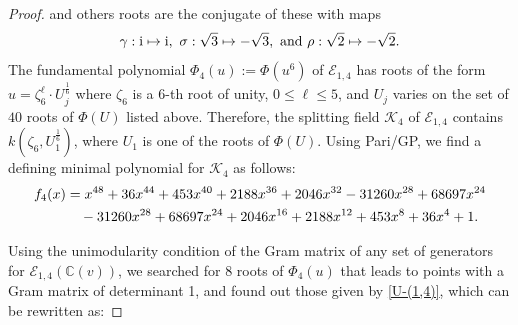 \documentclass[11pt]{amsart}
\newcommand{\CC}{{\mathbb C}}
\newcommand{\Ee}{{\mathcal E}}
\newcommand{\KK}{{\mathcal K}}
\numberwithin{equation}{section}
\numberwithin{table}{section}
\newcommand\<{\langle}
\begin{document}
\begin{proof}
	and others roots are the conjugate of these with maps  $$\gamma: {\rm{i}} \mapsto {\rm{i}}, \ \sigma: \sqrt{3}\mapsto -\sqrt{3}, \ \text{and} \ \rho: \sqrt{2}\mapsto -\sqrt{2}.$$ 
%
	The fundamental polynomial $\Phi_4(u):=\Phi(u^6)$ of  $\Ee_{1, 4}$  has roots of the form 
	$u=\zeta_{6}^\ell \cdot U_j^{\frac{1}{6}}$ where
	$\zeta_6$ is a $6$-th root of unity, $0\leq \ell \leq 5$, and $U_j$ varies on the set of $40$
	roots of $\Phi(U)$ listed above.
		Therefore,  the splitting field $\KK_4$ of $\Ee_{1, 4}$ contains 
	$k(\zeta_6, U_1^{\frac{1}{6}})$, where $U_1$ is one of the roots of $\Phi(U)$.
	Using Pari/GP, \cite[Gp-360]{Shioda360-Codes} we find a defining minimal polynomial for  $\KK_4$ as follows:
\begin{align}
f_4(x)	& =x^{48} + 36x^{44} + 453x^{40} + 2188x^{36} + 2046x^{32} - 31260x^{28} + 68697x^{24}\notag \\
	& \quad - 31260x^{28} + 68697x^{24} + 2046x^{16} + 2188x^{12} + 453x^{8} + 36x^{4} + 1. \label{f4}
\end{align}



Using the unimodularity condition  of the  Gram matrix of  any set of generators for  $\Ee_{1, 4}(\CC(v))$, we searched for 8 roots of $\Phi_4(u)$ that leads to points with a  Gram matrix of determinant 1, and found out those given by \ref{U-(1,4)}, which can be rewritten as:



\end{proof}
\end{document}
